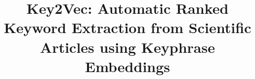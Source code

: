\documentclass[conference]{IEEEtran}
\begin{document}
%
\title{Key2Vec: Automatic Ranked Keyword Extraction from Scientific Articles using Keyphrase Embeddings}


\author{
\and
{}
\and
{}
\and
{}
}


% 








\maketitle
\end{document}
